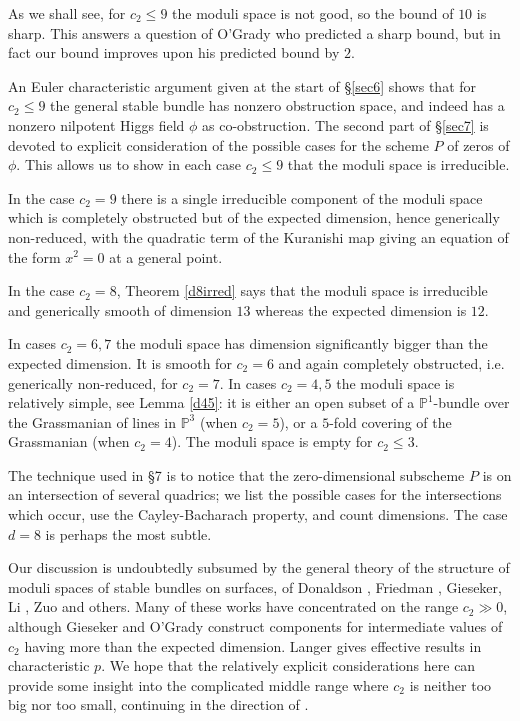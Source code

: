 \documentclass{amsart}
\theoremstyle{plain}
\numberwithin{equation}{section}
\begin{document}
As we shall see, for $c_2\leq 9$ the moduli space is not good,  
so the bound of $10$ is sharp. 
This answers a question of O'Grady
\cite{OGradyBasic} who predicted a sharp bound, 
but in fact our bound improves upon his predicted bound
by $2$. 

An Euler characteristic argument given at the start of \S \ref{sec6} shows that
for $c_2\leq 9$ the general stable bundle has nonzero obstruction space, and indeed 
has a nonzero nilpotent Higgs field $\phi$ as co-obstruction. The second part of \S \ref{sec7}
is devoted to explicit consideration of the possible cases for the scheme $P$ of zeros
of $\phi$. This allows us to show in each case $c_2\leq 9$ that the moduli space is irreducible.

In the case $c_2=9$ there is a
single irreducible component of the moduli space which is completely obstructed but of
the expected dimension, hence generically non-reduced,
with the quadratic term of the Kuranishi map giving an equation of
the form $x^2=0$ at a general point. 

In the case $c_2=8$, Theorem \ref{d8irred} says that the moduli space is irreducible and generically smooth of dimension $13$
whereas the expected dimension is $12$. 

In cases $c_2=6,7$ the moduli space has dimension significantly bigger than the expected
dimension. It is smooth for $c_2=6$ and again completely obstructed, i.e. generically
non-reduced, for $c_2=7$. In cases $c_2=4,5$ the moduli space is relatively simple, see
Lemma \ref{d45}: it is
either an open subset of a ${{\mathbb P}} ^1$-bundle over the Grassmanian of lines in ${{\mathbb P}} ^3$ (when $c_2=5$), or a $5$-fold covering of the Grassmanian (when $c_2=4$). The moduli space is empty for $c_2\leq 3$. 

The technique used in \S 7 is to notice that the zero-dimensional subscheme $P$ is
on an intersection of several quadrics; we list the possible cases for the intersections
which occur, use the Cayley-Bacharach property, and count dimensions. The case $d=8$ is
perhaps the most subtle. 

Our discussion is undoubtedly subsumed by the general theory of the
structure of moduli spaces of stable bundles on surfaces, of Donaldson \cite{Donaldson}, Friedman \cite{Friedman},
Gieseker, Li \cite{GiesekerLi} \cite{Li}, Zuo \cite{Zuo} and others. Many of  these
works have concentrated on the range $c_2\gg 0$, 
although Gieseker \cite{GiesekerCons} and O'Grady \cite{OGradyBasic} construct
components for intermediate values of $c_2$ having more than the expected dimension. 
Langer  \cite{Langer2} gives effective results in characteristic $p$.
We hope that the relatively explicit considerations here can provide some insight
into the complicated middle range where $c_2$ is neither too big nor too small,
continuing in the direction of \cite{Mestrano}. 
\end{document}

